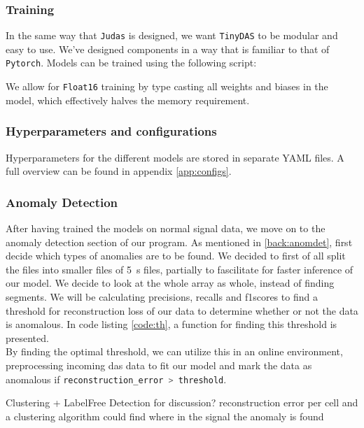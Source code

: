 \subsubsection{Training}

In the same way that \texttt{Judas} is designed, we want \texttt{TinyDAS} to be modular and easy to use. We've designed components in a way that is familiar to that of \texttt{Pytorch}. Models can be trained using the following script:



We allow for \texttt{Float16} training by type casting all weights and biases in the model, which effectively halves the memory requirement.

\subsubsection{Hyperparameters and configurations}

Hyperparameters for the different models are stored in separate YAML files. A full overview can be found in appendix \ref{app:configs}.


\subsubsection{Anomaly Detection}

After having trained the models on normal signal data, we move on to the anomaly detection section of our program. As mentioned in \ref{back:anomdet}, first decide which types of anomalies are to be found. We decided to first of all split the files into smaller files of \qty{5}{\si{\second}} files, partially to fascilitate for faster inference of our model. We decide to look at the whole array as whole, instead of finding segments. We will be calculating precisions, recalls and f1scores to find a threshold for reconstruction loss of our data to determine whether or not the data is anomalous. In code listing \ref{code:th}, a function for finding this threshold is presented.  \\



By finding the optimal threshold, we can utilize this in an online environment, preprocessing incoming \acrshort{das} data to fit our model and mark the data as anomalous if \lstinline[language=Julia]{reconstruction_error > threshold}. 

Clustering + LabelFree Detection for discussion? reconstruction error per cell and a clustering algorithm could find where in the signal the anomaly is found

